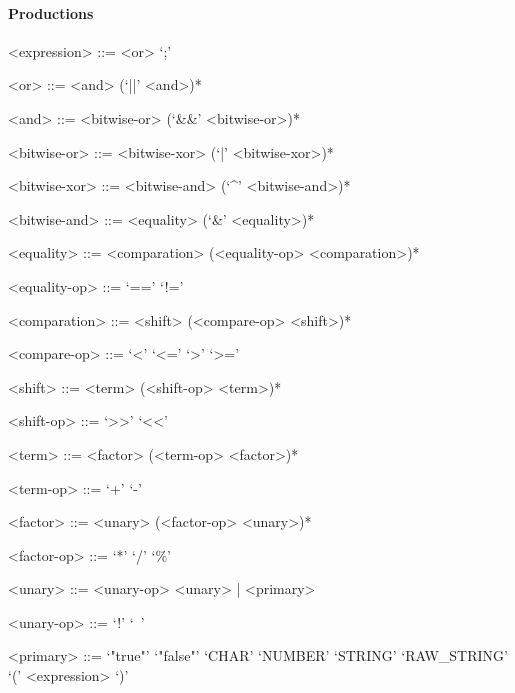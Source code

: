 \paragraph{Productions}
\setlength{\grammarparsep}{20pt plus 1pt minus 1pt} %
\setlength{\grammarindent}{12em} %

\begin{grammar}

<expression> ::= <or> `;'

<or> ::= <and> (`||' <and>)*

<and> ::= <bitwise-or> (`&&' <bitwise-or>)*

<bitwise-or> ::= <bitwise-xor> (`|' <bitwise-xor>)*

<bitwise-xor> ::= <bitwise-and> (`^' <bitwise-and>)*

<bitwise-and> ::= <equality> (`&' <equality>)*

<equality> ::= <comparation> (<equality-op> <comparation>)*

<equality-op> ::=
`==' 
\alt `!=' 

<comparation> ::= <shift> (<compare-op> <shift>)*

<compare-op> ::= 
`<' 
\alt `<=' 
\alt `>' 
\alt `>=' 

<shift> ::= <term> (<shift-op> <term>)*

<shift-op> ::=
`>>'
\alt `<<'

<term> ::= <factor> (<term-op> <factor>)*

<term-op> ::=
`+'
\alt `-'

<factor> ::= <unary> (<factor-op> <unary>)*

<factor-op> ::=
`*'
\alt `/'
\alt `\%'

<unary> ::= <unary-op> <unary> | <primary>

<unary-op> ::= `!'
\alt `~'

<primary> ::= 
`"true"'
\alt `"false"'
\alt `CHAR'
\alt `NUMBER'
\alt `STRING'
\alt `RAW_STRING'
\alt `(' <expression> `)'

\end{grammar}
